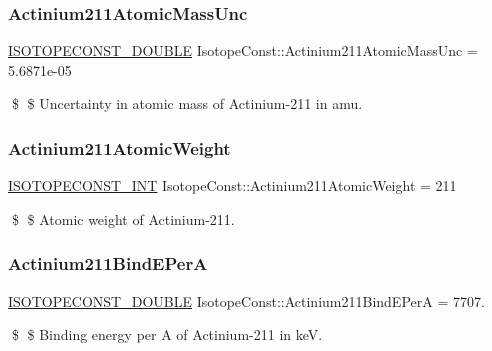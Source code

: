 \subsubsection{\texorpdfstring{Actinium211\+Atomic\+Mass\+Unc}{Actinium211AtomicMassUnc}}
{\footnotesize\ttfamily \mbox{\hyperlink{group___isotope_const-_macros_ga8f45a7272ce02c0b4c65c44636ed719a}{I\+S\+O\+T\+O\+P\+E\+C\+O\+N\+S\+T\+\_\+\+D\+O\+U\+B\+LE}} Isotope\+Const\+::\+Actinium211\+Atomic\+Mass\+Unc = 5.\+6871e-\/05}

\$ \$ Uncertainty in atomic mass of Actinium-\/211 in amu. \mbox{\label{group___isotope_const-_actinium-_ac211_ga280210a46c083e55d196502427d090c4}} 
\subsubsection{\texorpdfstring{Actinium211\+Atomic\+Weight}{Actinium211AtomicWeight}}
{\footnotesize\ttfamily \mbox{\hyperlink{group___isotope_const-_macros_ga5f18360b3e99483a35c32d789e62621c}{I\+S\+O\+T\+O\+P\+E\+C\+O\+N\+S\+T\+\_\+\+I\+NT}} Isotope\+Const\+::\+Actinium211\+Atomic\+Weight = 211}

\$ \$ Atomic weight of Actinium-\/211. \mbox{\label{group___isotope_const-_actinium-_ac211_gaadb120e199496a5e4bedcc378813c9f2}} 
\subsubsection{\texorpdfstring{Actinium211\+Bind\+E\+PerA}{Actinium211BindEPerA}}
{\footnotesize\ttfamily \mbox{\hyperlink{group___isotope_const-_macros_ga8f45a7272ce02c0b4c65c44636ed719a}{I\+S\+O\+T\+O\+P\+E\+C\+O\+N\+S\+T\+\_\+\+D\+O\+U\+B\+LE}} Isotope\+Const\+::\+Actinium211\+Bind\+E\+PerA = 7707.}

\$ \$ Binding energy per A of Actinium-\/211 in keV. \mbox{\label{group___isotope_const-_actinium-_ac211_ga9e3e656e3a1a84985274bbee63001595}} 
